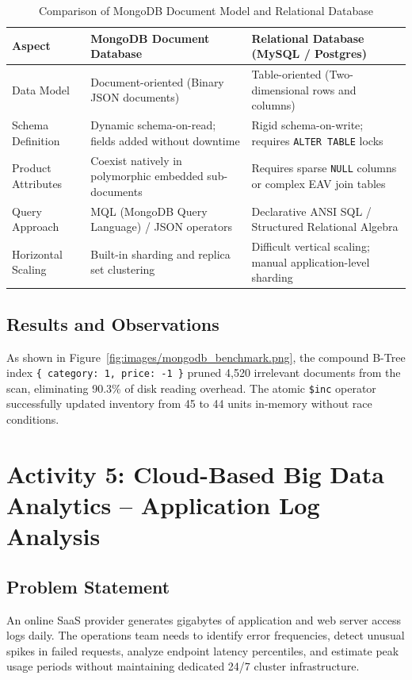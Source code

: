 \documentclass[12pt,a4paper]{report}
\newcommand{\activityheading}[2]{%
  \section{Activity #1: #2}%
}
\begin{document}
\begin{table}[H]
\centering
\caption{Comparison of MongoDB Document Model and Relational Database}
\label{tab:nosql_rdbms_comparison}
\begin{tabularx}{\textwidth}{|l|X|X|}
\hline
\textbf{Aspect} & \textbf{MongoDB Document Database} & \textbf{Relational Database (MySQL / Postgres)}\\
\hline
Data Model & Document-oriented (Binary JSON documents) & Table-oriented (Two-dimensional rows and columns)\\
\hline
Schema Definition & Dynamic schema-on-read; fields added without downtime & Rigid schema-on-write; requires \texttt{ALTER TABLE} locks\\
\hline
Product Attributes & Coexist natively in polymorphic embedded sub-documents & Requires sparse \texttt{NULL} columns or complex EAV join tables\\
\hline
Query Approach & MQL (MongoDB Query Language) / JSON operators & Declarative ANSI SQL / Structured Relational Algebra\\
\hline
Horizontal Scaling & Built-in sharding and replica set clustering & Difficult vertical scaling; manual application-level sharding\\
\hline
\end{tabularx}
\end{table}

\subsection{Results and Observations}
As shown in Figure~\ref{fig:images/mongodb_benchmark.png}, the compound B-Tree index \texttt{\{ category: 1, price: -1 \}} pruned 4,520 irrelevant documents from the scan, eliminating 90.3\% of disk reading overhead. The atomic \texttt{\$inc} operator successfully updated inventory from 45 to 44 units in-memory without race conditions.

\clearpage
\activityheading{5}{Cloud-Based Big Data Analytics -- Application Log Analysis}

\subsection{Problem Statement}
An online SaaS provider generates gigabytes of application and web server access logs daily. The operations team needs to identify error frequencies, detect unusual spikes in failed requests, analyze endpoint latency percentiles, and estimate peak usage periods without maintaining dedicated 24/7 cluster infrastructure.
\end{document}
